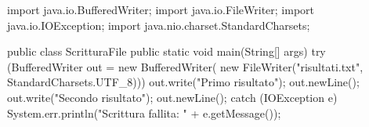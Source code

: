 \begin{unipdcode}[language=Java]
import java.io.BufferedWriter;
import java.io.FileWriter;
import java.io.IOException;
import java.nio.charset.StandardCharsets;

public class ScritturaFile {
    public static void main(String[] args) {
        try (BufferedWriter out = new BufferedWriter(
                new FileWriter("risultati.txt", StandardCharsets.UTF_8))) {
            out.write("Primo risultato");
            out.newLine();
            out.write("Secondo risultato");
            out.newLine();
        } catch (IOException e) {
            System.err.println("Scrittura fallita: " + e.getMessage());
        }
    }
}
\end{unipdcode}
